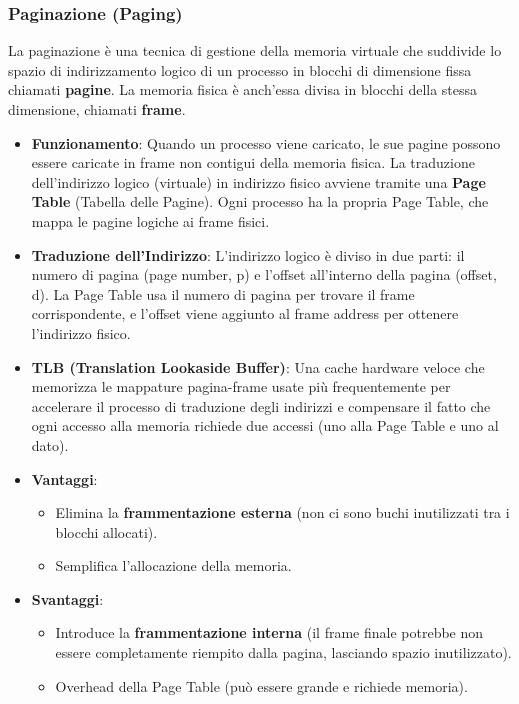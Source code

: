 \subsubsection{Paginazione (Paging)}
La paginazione è una tecnica di gestione della memoria virtuale che suddivide lo spazio di indirizzamento logico di un processo in blocchi di dimensione fissa chiamati \textbf{pagine}. La memoria fisica è anch'essa divisa in blocchi della stessa dimensione, chiamati \textbf{frame}.
\begin{itemize}
    \item \textbf{Funzionamento}: Quando un processo viene caricato, le sue pagine possono essere caricate in frame non contigui della memoria fisica. La traduzione dell'indirizzo logico (virtuale) in indirizzo fisico avviene tramite una \textbf{Page Table} (Tabella delle Pagine). Ogni processo ha la propria Page Table, che mappa le pagine logiche ai frame fisici.
    \item \textbf{Traduzione dell'Indirizzo}: L'indirizzo logico è diviso in due parti: il numero di pagina (page number, p) e l'offset all'interno della pagina (offset, d). La Page Table usa il numero di pagina per trovare il frame corrispondente, e l'offset viene aggiunto al frame address per ottenere l'indirizzo fisico.
    \item \textbf{TLB (Translation Lookaside Buffer)}: Una cache hardware veloce che memorizza le mappature pagina-frame usate più frequentemente per accelerare il processo di traduzione degli indirizzi e compensare il fatto che ogni accesso alla memoria richiede due accessi (uno alla Page Table e uno al dato).
    \item \textbf{Vantaggi}:
    \begin{itemize}
        \item Elimina la \textbf{frammentazione esterna} (non ci sono buchi inutilizzati tra i blocchi allocati).
        \item Semplifica l'allocazione della memoria.
    \end{itemize}
    \item \textbf{Svantaggi}:
    \begin{itemize}
        \item Introduce la \textbf{frammentazione interna} (il frame finale potrebbe non essere completamente riempito dalla pagina, lasciando spazio inutilizzato).
        \item Overhead della Page Table (può essere grande e richiede memoria).
    \end{itemize}
\end{itemize}

